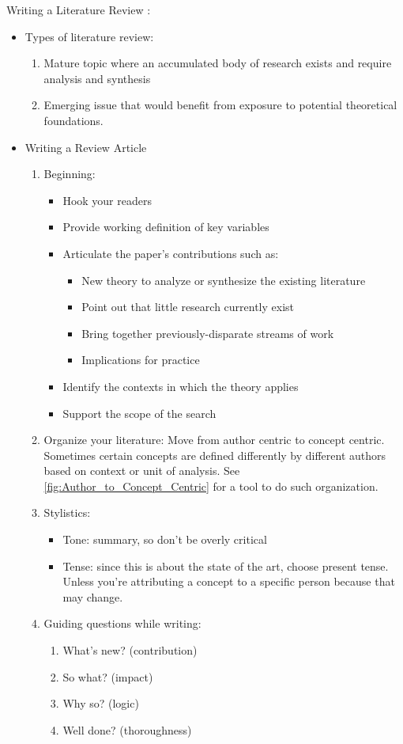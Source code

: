 \documentclass{TC}
\begin{document}
Writing a Literature Review \parencite{webster_analyzing_2002}:
\begin{itemize}
\item Types of literature review:
	\begin{enumerate}
	\item Mature topic where an accumulated body of research exists and require analysis and synthesis
	\item Emerging issue that would benefit from exposure to potential theoretical foundations.
	\end{enumerate}
\item Writing a Review Article
\begin{multicols}{2}
	\begin{enumerate}
	\item Beginning: 
		\begin{itemize}
		\item Hook your readers
		\item Provide working definition of key variables
		\item Articulate the paper's contributions such as:
			\begin{itemize}
			\item New theory to analyze or synthesize the existing literature
			\item Point out that little research currently exist
			\item Bring together previously-disparate streams of work
			\item Implications for practice
			\end{itemize}
		\item Identify the contexts in which the theory applies
		\item Support the scope of the search
		\end{itemize}
	\item Organize your literature: Move from author centric to concept centric. \dangersign Sometimes certain concepts are defined differently by different authors based on context or unit of analysis. See \autoref{fig:Author_to_Concept_Centric} for a tool to do such organization.
	\item Stylistics: 
		\begin{itemize}
		\item Tone: summary, so don't be overly critical  
		\item Tense: since this is about the state of the art, choose present tense. Unless you're attributing a concept to a specific person because that may change.
		\end{itemize}
	\item Guiding questions while writing:
		\begin{enumerate}
		\item What's new? (contribution)
		\item So what? (impact)
		\item Why so? (logic)
		\item Well done? (thoroughness)
		\end{enumerate}
	\end{enumerate}

\end{multicols}
\end{itemize}
\end{document}
